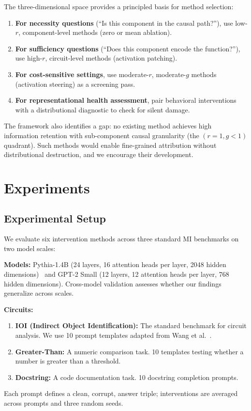\documentclass[pdflatex,sn-mathphys-num]{sn-jnl}
\begin{document}
The three-dimensional space provides a principled basis for method selection:
\begin{enumerate}
    \item \textbf{For necessity questions} (``Is this component in the causal path?''), use low-$r$, component-level methods (zero or mean ablation).
    \item \textbf{For sufficiency questions} (``Does this component encode the function?''), use high-$r$, circuit-level methods (activation patching).
    \item \textbf{For cost-sensitive settings}, use moderate-$r$, moderate-$g$ methods (activation steering) as a screening pass.
    \item \textbf{For representational health assessment}, pair behavioral interventions with a distributional diagnostic to check for silent damage.
\end{enumerate}

The framework also identifies a gap: no existing method achieves high information retention with sub-component causal granularity (the $(r=1, g<1)$ quadrant). Such methods would enable fine-grained attribution without distributional destruction, and we encourage their development.

\section{Experiments}
\label{sec:experiments}

\subsection{Experimental Setup}

We evaluate six intervention methods across three standard MI benchmarks on two model scales:

\textbf{Models:} Pythia-1.4B (24 layers, 16 attention heads per layer, 2048 hidden dimensions)~\cite{Biderman2023} and GPT-2 Small (12 layers, 12 attention heads per layer, 768 hidden dimensions). Cross-model validation assesses whether our findings generalize across scales.

\textbf{Circuits:}
\begin{enumerate}
    \item \textbf{IOI (Indirect Object Identification):} The standard benchmark for circuit analysis. We use 10 prompt templates adapted from Wang et al.~\cite{Wang2022}.
    \item \textbf{Greater-Than:} A numeric comparison task. 10 templates testing whether a number is greater than a threshold.
    \item \textbf{Docstring:} A code documentation task. 10 docstring completion prompts.
\end{enumerate}
Each prompt defines a {clean, corrupt, answer} triple; interventions are averaged across prompts and three random seeds.
\end{document}
